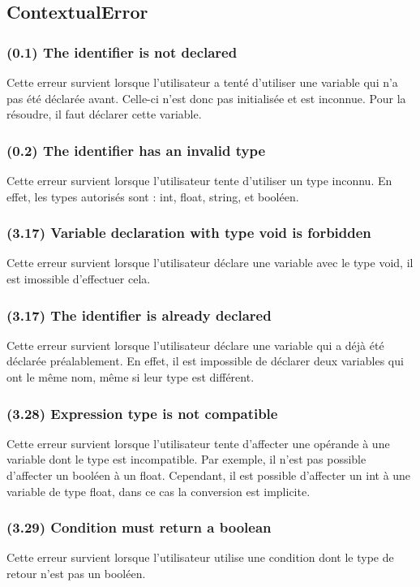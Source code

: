\documentclass[12pt, a4paper, one side]{article}
\begin{document}
\subsection{ContextualError}
\subsubsection{(0.1) The identifier is not declared}
Cette erreur survient lorsque l'utilisateur a tenté d'utiliser une variable qui n'a pas été déclarée avant. Celle-ci n'est donc
pas initialisée et est inconnue. Pour la résoudre, il faut déclarer cette variable.

\subsubsection{(0.2) The identifier has an invalid type}
Cette erreur survient lorsque l'utilisateur tente d'utiliser un type inconnu. En effet, les types autorisés sont : int, float, string, et booléen.

\subsubsection{(3.17) Variable declaration with type void is forbidden}
Cette erreur survient lorsque l'utilisateur déclare une variable avec le type void, il est imossible d'effectuer cela.

\subsubsection{(3.17) The identifier is already declared}
Cette erreur survient lorsque l'utilisateur déclare une variable qui a déjà été déclarée préalablement. En effet, il est impossible de déclarer deux variables qui ont le même nom, même si leur type est différent.

\subsubsection{(3.28) Expression type is not compatible}
Cette erreur survient lorsque l'utilisateur tente d'affecter une opérande à une variable dont le type est incompatible. Par exemple, il n'est pas possible d'affecter un booléen à un float. Cependant, il est possible d'affecter un int à une variable de type float, dans ce cas la conversion est implicite.

\subsubsection{(3.29) Condition must return a boolean}
Cette erreur survient lorsque l'utilisateur utilise une condition dont le type de retour n'est pas un booléen.
\end{document}
